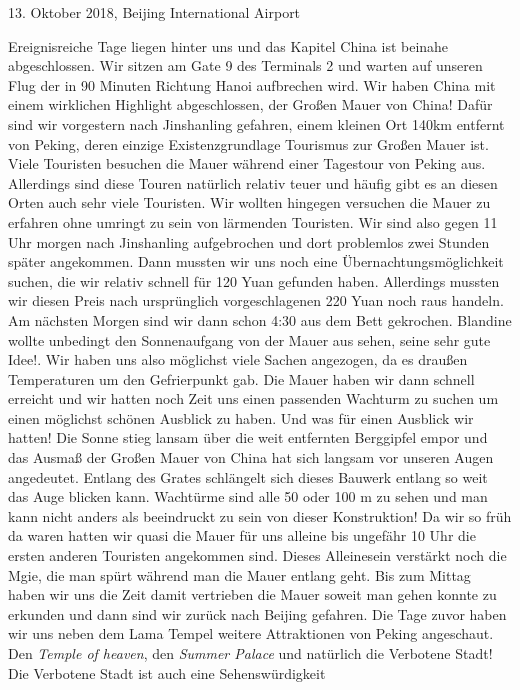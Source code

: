 \documentclass[11pt]{book}
\begin{document}
13. Oktober 2018, Beijing International Airport

Ereignisreiche Tage liegen hinter uns und das Kapitel China ist beinahe abgeschlossen. Wir sitzen am Gate 9 des 
Terminals 2 und warten auf unseren Flug der in 90 Minuten Richtung Hanoi aufbrechen wird. Wir haben China mit einem 
wirklichen Highlight abgeschlossen, der Großen Mauer von China! Dafür sind wir vorgestern nach Jinshanling gefahren, 
einem kleinen Ort 140km entfernt von Peking, deren einzige Existenzgrundlage Tourismus zur Großen Mauer ist. Viele 
Touristen besuchen die Mauer während einer Tagestour von Peking aus. Allerdings sind diese Touren natürlich relativ 
teuer und häufig gibt es an diesen Orten auch sehr viele Touristen. Wir wollten hingegen versuchen die Mauer zu erfahren 
ohne umringt zu sein von lärmenden Touristen. Wir sind also gegen 11 Uhr morgen nach Jinshanling aufgebrochen und dort 
problemlos zwei Stunden später angekommen. Dann mussten wir uns noch eine Übernachtungsmöglichkeit suchen, die wir 
relativ schnell für 120 Yuan gefunden haben. Allerdings mussten wir diesen Preis nach ursprünglich vorgeschlagenen 
220 Yuan noch raus handeln. Am nächsten Morgen sind wir dann schon 4:30 aus dem Bett gekrochen. Blandine wollte 
unbedingt den Sonnenaufgang von der Mauer aus sehen, seine sehr gute Idee!. Wir haben uns also möglichst viele 
Sachen angezogen, da es draußen Temperaturen um den Gefrierpunkt gab. Die Mauer haben wir dann schnell erreicht und 
wir hatten noch Zeit uns einen passenden Wachturm zu suchen um einen möglichst schönen Ausblick zu haben. Und was 
für einen Ausblick wir hatten! Die Sonne stieg lansam über die weit entfernten Berggipfel empor und das Ausmaß der
Großen Mauer von China hat sich langsam vor unseren Augen angedeutet. Entlang des Grates schlängelt sich dieses 
Bauwerk entlang so weit das Auge blicken kann. Wachtürme sind alle 50 oder 100 m zu sehen und man kann nicht anders 
als beeindruckt zu sein von dieser Konstruktion! Da wir so früh da waren hatten wir quasi die Mauer für uns alleine 
bis ungefähr 10 Uhr die ersten anderen Touristen angekommen sind. Dieses Alleinesein verstärkt noch die Mgie, die 
man spürt während man die Mauer entlang geht. Bis zum Mittag haben wir uns die Zeit damit vertrieben die Mauer 
soweit man gehen konnte zu erkunden und dann sind wir zurück nach Beijing gefahren.
Die Tage zuvor haben wir uns neben dem Lama Tempel weitere Attraktionen von Peking angeschaut. Den \emph{Temple 
of heaven}, den \emph{Summer Palace} und natürlich die Verbotene Stadt! Die Verbotene Stadt ist auch eine Sehenswürdigkeit 
\end{document}
